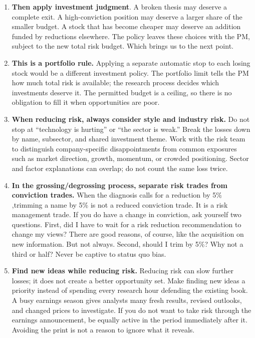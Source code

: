 \documentclass[11pt]{gappyarticle}
\begin{document}
\begin{enumerate}
If the book currently carries \$40 million of dollar volatility and the recommended volatility
is \$44 million, the multiplier is 1.1: indicatively add 10\% to each position.  
\item \textbf{Then apply investment judgment}. A broken thesis may deserve a complete exit.
A high-conviction position may deserve a larger share of the smaller budget.
A stock that has become cheaper may deserve an addition funded by reductions
elsewhere. The policy leaves these choices with the PM, subject to the new
total risk budget. Which brings us to the next point.
\item \textbf{This is a portfolio rule.} Applying a separate automatic stop to each losing
stock would be a different investment policy. The portfolio limit tells the
PM how much total risk is available; the research process decides which
investments deserve it. The permitted budget is a ceiling, so there is no
obligation to fill it when opportunities are poor.
\item\textbf{When reducing risk, always consider style and industry risk.} Do not stop at ``technology is hurting'' or ``the sector is weak.'' Break the
losses down by name, subsector, and shared investment theme. Work with the risk
team to distinguish company-specific disappointments from common exposures
such as market direction, growth, momentum, or crowded positioning. Sector
and factor explanations can overlap; do not count the same loss twice.
\item \textbf{In the grossing/degrossing process, separate risk trades from conviction trades.} When the diagnosis calls for a reduction by 5\% ,trimming a name by 5\% is not a reduced conviction trade. It is a risk management trade. If you do have a change in conviction, ask yourself two questions. First, did I have to wait for a risk reduction recommendation to change my views? There are good reasons, of course, like the acquisition on new information. But not always. Second, should I trim by 5\%? Why not a third or half? Never be captive to status quo bias.
\item \textbf{Find new ideas while reducing risk.} Reducing risk can slow further losses; it does not create a better opportunity
set. Make finding new ideas a priority instead of spending every research hour
defending the existing book. A busy earnings season gives analysts many fresh
results, revised outlooks, and changed prices to investigate. If you do not
want to take risk through the earnings announcement, be equally active in the
period immediately after it. Avoiding the print is not a reason to ignore
what it reveals.
 
\end{enumerate}
\end{document}
